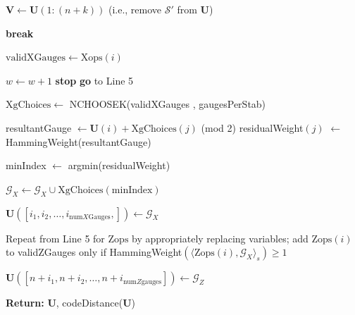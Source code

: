 \documentclass[conference]{IEEEtran}
\begin{document}
\begin{algorithm}[!htp]
\begin{algorithmic}[2]
$\boldsymbol{V}\gets \boldsymbol{U}(1:(n+k))$ (i.e., remove $\mathcal{S}'$ from $\boldsymbol{U}$) 


  
  \State \textbf{break}
  \EndIf
  
      
      
   \State $\mathrm{validXGauges} \gets \mathrm{Xops}(i)$ 
  \EndIf

\EndFor

\State $w \gets w + 1$
           \State \textbf{stop}
       \Else
            \State \textbf{go} to Line 5
        \EndIf
\EndIf

\State $\mathrm{XgChoices} \gets $ NCHOOSEK(validXGauges , gaugesPerStab)

\State resultantGauge $\gets \boldsymbol{U}(i) + \mathrm{XgChoices}(j)$ (mod 2)
\State residualWeight$(j)$ $\gets$ HammingWeight(resultantGauge)
\EndFor

\State minIndex $\gets$ argmin(residualWeight)

\State $\mathcal{G}_{X} \gets \mathcal{G}_X \cup \mathrm{XgChoices(minIndex)}$


 

    
\EndFor

\State $\boldsymbol{U}([i_1, i_2, \ldots, i_{\mathrm{num}X\mathrm{Gauges}},]) \gets \mathcal{G}_X$

\State Repeat from Line 5 for $\mathrm{Zops}$ by appropriately replacing variables; add $\mathrm{Zops}(i)$ to validZGauges only if HammingWeight$\left( \langle \mathrm{Zops}(i),\mathcal{G}_{X} \rangle_{s} \right) \geq 1$


\State $\boldsymbol{U}([n+i_1, n+i_2, \ldots, n+i_{\mathrm{num}Z\mathrm{gauges}}
]) \gets \mathcal{G}_Z$


\State \textbf{Return:} $\boldsymbol{U}$, codeDistance($\boldsymbol{U}$)

\end{algorithmic}

\end{algorithm}
\end{document}
